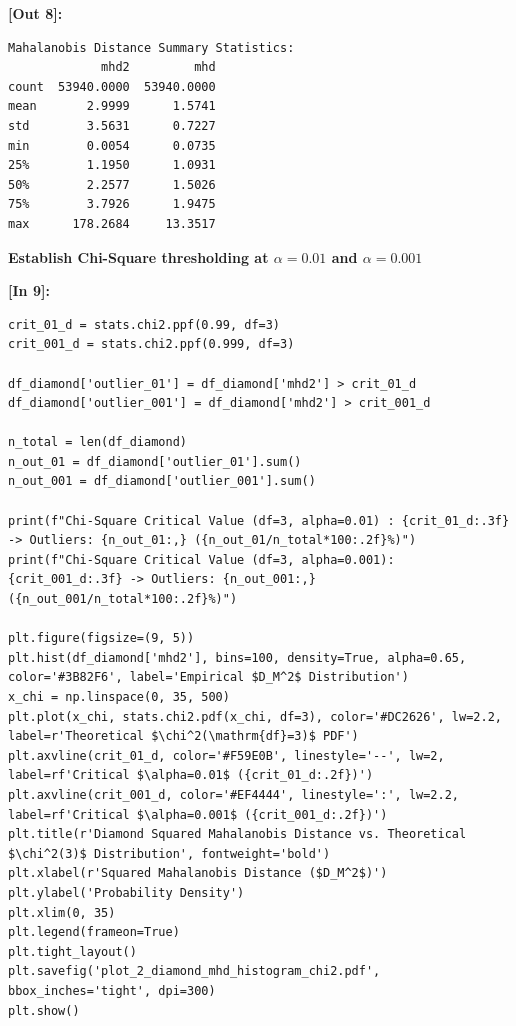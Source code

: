 \vspace{0.2em}
\noindent\textbf{\small [Out 8]:}
\begin{lstlisting}[style=output]
Mahalanobis Distance Summary Statistics:
             mhd2         mhd
count  53940.0000  53940.0000
mean       2.9999      1.5741
std        3.5631      0.7227
min        0.0054      0.0735
25%        1.1950      1.0931
50%        2.2577      1.5026
75%        3.7926      1.9475
max      178.2684     13.3517
\end{lstlisting}
\vspace{0.3em}
\begin{tcolorbox}[colback=gray!5!white,colframe=gray!50!black,boxrule=0.5pt,arc=2pt,left=5pt,right=5pt,top=2pt,bottom=2pt,unbreakable,before upper={\sloppy\raggedright}]
{\small\bfseries Establish Chi-Square thresholding at $\alpha = 0.01$ and $\alpha = 0.001$\par}
\end{tcolorbox}
\vspace{0.2em}
\vspace{0.4em}
\noindent\textbf{\small [In 9]:}
\begin{lstlisting}[style=pycode]
crit_01_d = stats.chi2.ppf(0.99, df=3)
crit_001_d = stats.chi2.ppf(0.999, df=3)

df_diamond['outlier_01'] = df_diamond['mhd2'] > crit_01_d
df_diamond['outlier_001'] = df_diamond['mhd2'] > crit_001_d

n_total = len(df_diamond)
n_out_01 = df_diamond['outlier_01'].sum()
n_out_001 = df_diamond['outlier_001'].sum()

print(f"Chi-Square Critical Value (df=3, alpha=0.01) : {crit_01_d:.3f} -> Outliers: {n_out_01:,} ({n_out_01/n_total*100:.2f}%)")
print(f"Chi-Square Critical Value (df=3, alpha=0.001): {crit_001_d:.3f} -> Outliers: {n_out_001:,} ({n_out_001/n_total*100:.2f}%)")

plt.figure(figsize=(9, 5))
plt.hist(df_diamond['mhd2'], bins=100, density=True, alpha=0.65, color='#3B82F6', label='Empirical $D_M^2$ Distribution')
x_chi = np.linspace(0, 35, 500)
plt.plot(x_chi, stats.chi2.pdf(x_chi, df=3), color='#DC2626', lw=2.2, label=r'Theoretical $\chi^2(\mathrm{df}=3)$ PDF')
plt.axvline(crit_01_d, color='#F59E0B', linestyle='--', lw=2, label=rf'Critical $\alpha=0.01$ ({crit_01_d:.2f})')
plt.axvline(crit_001_d, color='#EF4444', linestyle=':', lw=2.2, label=rf'Critical $\alpha=0.001$ ({crit_001_d:.2f})')
plt.title(r'Diamond Squared Mahalanobis Distance vs. Theoretical $\chi^2(3)$ Distribution', fontweight='bold')
plt.xlabel(r'Squared Mahalanobis Distance ($D_M^2$)')
plt.ylabel('Probability Density')
plt.xlim(0, 35)
plt.legend(frameon=True)
plt.tight_layout()
plt.savefig('plot_2_diamond_mhd_histogram_chi2.pdf', bbox_inches='tight', dpi=300)
plt.show()
\end{lstlisting}
